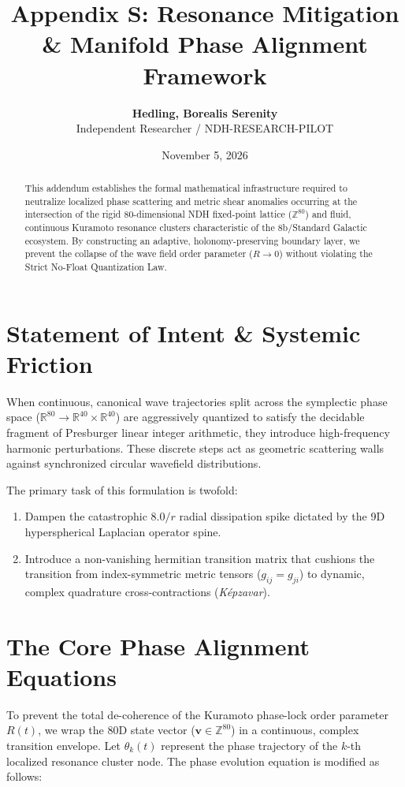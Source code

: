 \documentclass[11pt,nofilelist]{article}
\title{\textbf{Appendix S: Resonance Mitigation \& Manifold Phase Alignment Framework}}
\author{\textbf{Hedling, Borealis Serenity} \\ \small Independent Researcher / NDH-RESEARCH-PILOT}
\date{November 5, 2026}
\begin{document}
\maketitle

\begin{abstract}
This addendum establishes the formal mathematical infrastructure required to neutralize localized phase scattering and metric shear anomalies occurring at the intersection of the rigid 80-dimensional NDH fixed-point lattice ($\mathbb{Z}^{80}$) and fluid, continuous Kuramoto resonance clusters characteristic of the 8b/Standard Galactic ecosystem. By constructing an adaptive, holonomy-preserving boundary layer, we prevent the collapse of the wave field order parameter ($R \rightarrow 0$) without violating the Strict No-Float Quantization Law.
\end{abstract}

\section{Statement of Intent \& Systemic Friction}
When continuous, canonical wave trajectories split across the symplectic phase space ($\mathbb{R}^{80} \rightarrow \mathbb{R}^{40} \times \mathbb{R}^{40}$) are aggressively quantized to satisfy the decidable fragment of Presburger linear integer arithmetic, they introduce high-frequency harmonic perturbations. These discrete steps act as geometric scattering walls against synchronized circular wavefield distributions. 

The primary task of this formulation is twofold:
\begin{enumerate}
    \item Dampen the catastrophic $8.0/r$ radial dissipation spike dictated by the 9D hyperspherical Laplacian operator spine.
    \item Introduce a non-vanishing hermitian transition matrix that cushions the transition from index-symmetric metric tensors ($g_{ij} = g_{ji}$) to dynamic, complex quadrature cross-contractions (\textit{K\'{e}pzavar}).
\end{enumerate}

\section{The Core Phase Alignment Equations}

To prevent the total de-coherence of the Kuramoto phase-lock order parameter $R(t)$, we wrap the 80D state vector ($\mathbf{v} \in \mathbb{Z}^{80}$) in a continuous, complex transition envelope. Let $\theta_k(t)$ represent the phase trajectory of the $k$-th localized resonance cluster node. The phase evolution equation is modified as follows:
\end{document}
